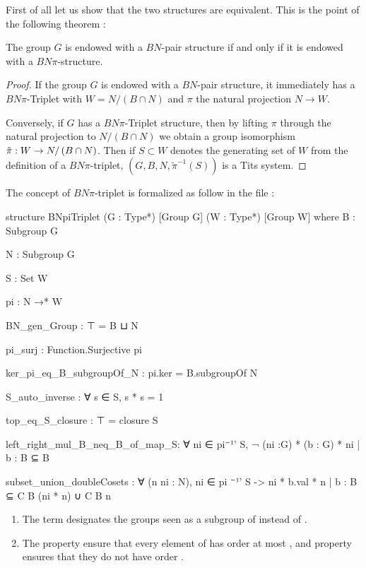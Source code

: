 First of all let us show that the two structures are equivalent. This is the point of the following theorem :

\begin{theoreme} \label{thm:to pi or not to pi}
    The group $G$ is endowed with a $BN$-pair structure if and only if it is endowed with a $BN\pi$-structure.
\end{theoreme}

\begin{proof}
    If the group $G$ is endowed with a $BN$-pair structure, it immediately has a $BN\pi$-Triplet with $W = N / (B \cap N)$ and $\pi$ the natural projection $N \to W$.

    Conversely, if $G$ has a $BN\pi$-Triplet structure, then by lifting $\pi$ through the natural projection to $N / \left( B \cap N \right)$ we obtain a group isomorphism $\tilde{\pi} : W \to N / \left( B \cap N \right)$. Then if $S \subset W$ denotes the generating set of $W$ from the definition of a $BN\pi$-triplet, $\left(G, B, N, \tilde{\pi}^{-1}\left( S \right)  \right)$ is a Tits system.
\end{proof}

The concept of $BN\pi$-triplet is formalized as follow in the  file :

\begin{leancode}
structure BNpiTriplet (G : Type*) [Group G] (W : Type*) [Group W] where
  B : Subgroup G

  N : Subgroup G
  
  S : Set W

  pi : N →* W

  BN_gen_Group : ⊤ = B ⊔ N

  pi_surj : Function.Surjective pi

  ker_pi_eq_B_subgroupOf_N : pi.ker = B.subgroupOf N

  S_auto_inverse : ∀ s ∈ S, s * s = 1

  top_eq_S_closure : ⊤ = closure S

  left_right_mul_B_neq_B_of_map_S: ∀ ni ∈ pi⁻¹' S,
    ¬ {(ni :G) * (b : G) * ni | b : B} ⊆  B

  subset_union_doubleCosets :  ∀ (n ni : N), ni ∈ pi ⁻¹' S ->
   {ni * b.val * n | b : B} ⊆ C B (ni * n) ∪ C B n
\end{leancode}

\begin{remarque}
    \begin{enumerate}
        \item The term  designates the groups  seen as a subgroup of  instead of .
        \item The property  ensure that every element of  has order at most , and property   ensures that they do not have order .
    \end{enumerate}
    
\end{remarque}

